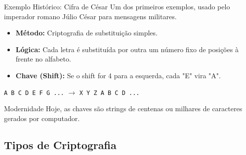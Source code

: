 \documentclass[aspectratio=169]{beamer}
\begin{document}
\begin{frame}{Exemplo Histórico: Cifra de César}
    Um dos primeiros exemplos, usado pelo imperador romano Júlio César para mensagens militares.
    \begin{itemize}
        \item \textbf{Método:} Criptografia de substituição simples.
        \item \textbf{Lógica:} Cada letra é substituída por outra um número fixo de posições à frente no alfabeto.
        \item \textbf{Chave (Shift):} Se o shift for 4 para a esquerda, cada "E" vira "A".
    \end{itemize}
    \centering
    \texttt{A B C D E F G ...} $\rightarrow$ \texttt{X Y Z A B C D ...}
    \vspace{0.3cm}
    \begin{exampleblock}{Modernidade}
        Hoje, as chaves são strings de centenas ou milhares de caracteres gerados por computador.
    \end{exampleblock}
\end{frame}

\subsection{Tipos de Criptografia}
\end{document}
